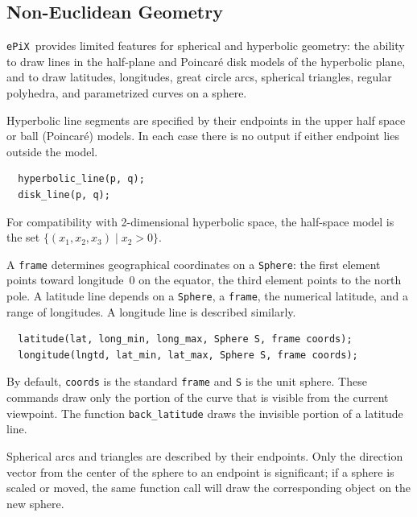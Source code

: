 \documentclass[12pt,letterpaper]{book}
\newcommand{\code}[1]{\texttt{#1}}
\newcommand{\ePiX}{\code{ePiX}}
\newcommand{\teximath}[1]{$#1$}
\newcommand{\findex}[1]{\ignorespaces}
\begin{document}
\subsection{Non-Euclidean Geometry}
\label{non-eucl}

\ePiX\ provides limited features for spherical and hyperbolic
geometry: the ability to draw lines in the half-plane and Poincar\'e
disk models of the hyperbolic plane, and to draw latitudes,
longitudes, great circle arcs, spherical triangles, regular polyhedra,
and parametrized curves on a sphere.

Hyperbolic line segments are specified by their endpoints in the upper
half space or ball (Poincar\'e) models.  In each case there is no
output if either endpoint lies outside the model.
\findex{hyperbolic\_line}
\findex{disk\_line}
\begin{verbatim}
  hyperbolic_line(p, q);
  disk_line(p, q);
\end{verbatim}
For compatibility with 2-dimensional hyperbolic space, the half-space
model is the set \teximath{\{(x_1,x_2,x_3)\mid x_2>0\}}.

A \code{frame} determines geographical coordinates on a \code{Sphere}:
the first element points toward longitude~0 on the equator, the third
element points to the north pole.  A latitude line depends on a
\code{Sphere}, a \code{frame}, the numerical latitude, and a range of
longitudes. A longitude line is described similarly.
\findex{latitude}
\findex{longitude}
\findex{back\_latitude}
\findex{back\_longitude}
\begin{verbatim}
  latitude(lat, long_min, long_max, Sphere S, frame coords);
  longitude(lngtd, lat_min, lat_max, Sphere S, frame coords);
\end{verbatim}
By default, \code{coords} is the standard \code{frame} and \code{S} is
the unit sphere. These commands draw only the portion of the curve
that is visible from the current viewpoint. The function
\code{back\_latitude} draws the invisible portion of a latitude line.

Spherical arcs and triangles are described by their endpoints. Only
the direction vector from the center of the sphere to an endpoint is
significant; if a sphere is scaled or moved, the same function call
will draw the corresponding object on the new sphere. 
\end{document}
